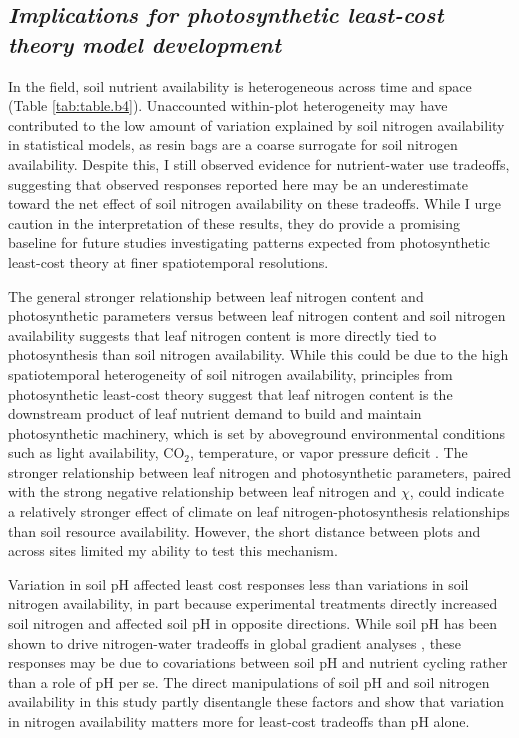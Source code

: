 \subsection{\textit{Implications for photosynthetic least-cost theory model development}}
\noindent In the field, soil nutrient availability is heterogeneous across time and space (Table \ref{tab:table.b4}). Unaccounted within-plot heterogeneity may have contributed to the low amount of variation explained by soil nitrogen availability in statistical models, as resin bags are a coarse surrogate for soil nitrogen availability. Despite this, I still observed evidence for nutrient-water use tradeoffs, suggesting that observed responses reported here may be an underestimate toward the net effect of soil nitrogen availability on these tradeoffs. While I urge caution in the interpretation of these results, they do provide a promising baseline for future studies investigating patterns expected from photosynthetic least-cost theory at finer spatiotemporal resolutions.
    
The general stronger relationship between leaf nitrogen content and photosynthetic parameters versus between leaf nitrogen content and soil nitrogen availability suggests that leaf nitrogen content is more directly tied to photosynthesis than soil nitrogen availability. While this could be due to the high spatiotemporal heterogeneity of soil nitrogen availability, principles from photosynthetic least-cost theory suggest that leaf nitrogen content is the downstream product of leaf nutrient demand to build and maintain photosynthetic machinery, which is set by aboveground environmental conditions such as light availability, CO$_2$, temperature, or vapor pressure deficit . The stronger relationship between leaf nitrogen and photosynthetic parameters, paired with the strong negative relationship between leaf nitrogen and $\chi$, could indicate a relatively stronger effect of climate on leaf nitrogen-photosynthesis relationships than soil resource availability. However, the short distance between plots and across sites limited my ability to test this mechanism.
    
Variation in soil pH affected least cost responses less than variations in soil nitrogen availability, in part because experimental treatments directly increased soil nitrogen and affected soil pH in opposite directions. While soil pH has been shown to drive nitrogen-water tradeoffs in global gradient analyses , these responses may be due to covariations between soil pH and nutrient cycling rather than a role of pH per se. The direct manipulations of soil pH and soil nitrogen availability in this study partly disentangle these factors and show that variation in nitrogen availability matters more for least-cost tradeoffs than pH alone.

